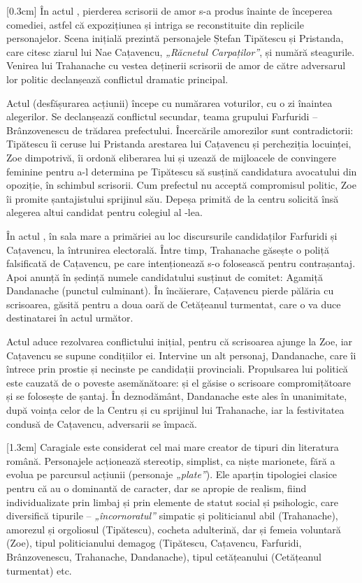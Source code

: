 [0.3cm]
În actul , pierderea scrisorii de amor s-a produs înainte de începerea comediei, astfel că expozițiunea și intriga se reconstituite din replicile personajelor. Scena inițială prezintă personajele Ștefan Tipătescu și Pristanda, care citesc ziarul lui Nae Cațavencu, \textit{„Răcnetul Carpaților”}, și numără steagurile. Venirea lui Trahanache cu vestea deținerii scrisorii de amor de către adversarul lor politic declanșează conflictul dramatic principal.

Actul  (desfășurarea acțiunii) începe cu numărarea voturilor, cu o zi înaintea alegerilor. Se declanșează conflictul secundar, teama grupului Farfuridi -- Brânzovenescu de trădarea prefectului. Încercările amorezilor sunt contradictorii: Tipătescu îi ceruse lui Pristanda arestarea lui Cațavencu și percheziția locuinței, Zoe dimpotrivă, îi ordonă eliberarea lui și uzează de mijloacele de convingere feminine pentru a-l determina pe Tipătescu să susțină candidatura avocatului din opoziție, în schimbul scrisorii. Cum prefectul nu acceptă compromisul politic, Zoe îi promite șantajistului sprijinul său. Depeșa primită de la centru solicită însă alegerea altui candidat pentru colegiul al \hbox{-lea}.

În actul , în sala mare a primăriei au loc discursurile candidaților Farfuridi și Cațavencu, la întrunirea electorală. Între timp, Trahanache găsește o poliță falsificată de Cațavencu, pe care intenționează s-o folosească pentru contrașantaj. Apoi anunță în ședință numele candidatului susținut de comitet: Agamiță Dandanache (punctul culminant). În încăierare, Cațavencu pierde pălăria cu scrisoarea, găsită pentru a doua oară de Cetățeanul turmentat, care o va duce destinatarei în actul următor.

Actul  aduce rezolvarea conflictului inițial, pentru că scrisoarea ajunge la Zoe, iar Cațavencu se supune condițiilor ei. Intervine un alt personaj, Dandanache, care îi întrece prin prostie și necinste pe candidații provinciali. Propulsarea lui politică este cauzată de o poveste asemănătoare: și el găsise o scrisoare compromițătoare și se folosește de șantaj. În deznodământ, Dandanache este ales în unanimitate, după voința celor de la Centru și cu sprijinul lui Trahanache, iar la festivitatea condusă de Cațavencu, adversarii se împacă.

[1.3cm]
Caragiale este considerat cel mai mare creator de tipuri din literatura română. Personajele acționează stereotip, simplist, ca niște marionete, fără a evolua pe parcursul acțiunii (personaje \textit{„plate”}). Ele aparțin tipologiei clasice pentru că au o dominantă de caracter, dar se apropie de realism, fiind individualizate prin limbaj și prin elemente de statut social și psihologic, care diversifică tipurile -- \textit{„încornoratul”} simpatic și politicianul abil (Trahanache), amorezul și orgoliosul (Tipătescu), cocheta adulterină, dar și femeia voluntară (Zoe), tipul politicianului demagog (Tipătescu, Cațavencu, Farfuridi, Brânzovenescu, Trahanache, Dandanache), tipul cetățeanului (Cetățeanul turmentat) etc.


